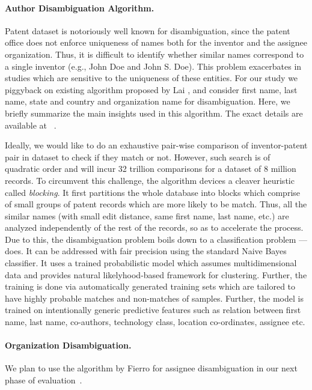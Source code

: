 \paragraph{Author Disambiguation Algorithm.}

Patent dataset is notoriously well known for disambiguation, since the patent office does not enforce uniqueness of names both for the inventor and the assignee organization. Thus, it is difficult to identify whether similar names correspond to a single inventor (e.g., John Doe and John S. Doe). This problem exacerbates in studies which are sensitive to the uniqueness of these entities.
For our study we piggyback on existing algorithm proposed by Lai \etal, and consider first name, last name, state and country and organization name for disambiguation.
Here, we briefly summarize the main insights used in this algorithm. The exact details are available at ~\cite{disambiguation}. 

Ideally, we would like to do an exhaustive pair-wise comparison of inventor-patent pair in dataset to check if they match or not. However, such search is of quadratic order and will incur 32 trillion comparisons for a dataset of 8 million records. 
To circumvent this challenge, the algorithm devices a cleaver heuristic called {\em blocking}. 
It first partitions the whole database into blocks which comprise of small groups of patent records which are more likely to be match. Thus, all the similar names (with small edit distance, same first name, last name, etc.) are 
analyzed independently of the rest of the records, so as to accelerate the process. Due to this, the disambiguation problem boils down to a classification problem --- does. It can be addressed with fair precision using the standard Naive Bayes classifier. 
It uses a trained probabilistic model which assumes multidimensional data and provides natural likelyhood-based framework for clustering. Further, the training is done via automatically generated training sets which are tailored to have highly probable matches and non-matches of samples. Further, the model is trained on intentionally generic predictive features such as relation between first name, last name, co-authors, technology class, location co-ordinates, assignee etc. 

\paragraph{Organization Disambiguation.}
We plan to use the algorithm by Fierro \etal for assignee disambiguation in our next phase of evaluation~\cite{newdisambiguation}.




